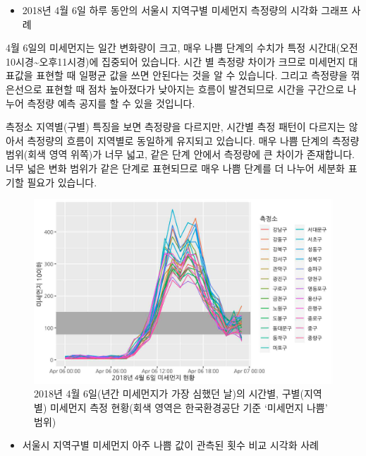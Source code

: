 \documentclass[
  letterpaper,
]{book}
\providecommand{\tightlist}{%
  \setlength{\itemsep}{0pt}\setlength{\parskip}{0pt}}\usepackage{longtable,booktabs,array}
\begin{document}
\begin{itemize}
\tightlist
\item
  2018년 4월 6일 하루 동안의 서울시 지역구별 미세먼지 측정량의 시각화
  그래프 사례
\end{itemize}

4월 6일의 미세먼지는 일간 변화량이 크고, 매우 나쁨 단계의 수치가 특정
시간대(오전 10시경\textasciitilde 오후11시경)에 집중되어 있습니다. 시간
별 측정량 차이가 크므로 미세먼지 대표값을 표현할 때 일평균 값을 쓰면
안된다는 것을 알 수 있습니다. 그리고 측정량을 꺾은선으로 표현할 때 점차
높아졌다가 낮아지는 흐름이 발견되므로 시간을 구간으로 나누어 측정량 예측
공지를 할 수 있을 것입니다.

측정소 지역별(구별) 특징을 보면 측정량을 다르지만, 시간별 측정 패턴이
다르지는 않아서 측정량의 흐름이 지역별로 동일하게 유지되고 있습니다.
매우 나쁨 단계의 측정량 범위(회색 영역 위쪽)가 너무 넓고, 같은 단계
안에서 측정량에 큰 차이가 존재합니다. 너무 넓은 변화 범위가 같은 단계로
표현되므로 매우 나쁨 단계를 더 나누어 세분화 표기할 필요가 있습니다.

\begin{figure}[H]

{\centering \includegraphics{img/fig6.png}

}

\caption{2018년 4월 6일(년간 미세먼지가 가장 심했던 날)의 시간별,
구별(지역별) 미세먼지 측정 현황(회색 영역은 한국환경공단 기준 `미세먼지
나쁨' 범위)}

\end{figure}%

\begin{itemize}
\tightlist
\item
  서울시 지역구별 미세먼지 아주 나쁨 값이 관측된 횟수 비교 시각화 사례
\end{itemize}
\end{document}
